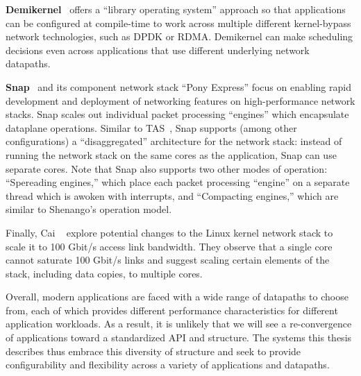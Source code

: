 \textbf{Demikernel}~\cite{demikernel} offers a ``library operating system'' approach so that applications can be configured at compile-time to work across multiple different kernel-bypass network technologies, such as DPDK or RDMA. Demikernel can make scheduling decisions even across applications that use different underlying network datapaths.

\textbf{Snap}~\cite{snap} and its component network stack ``Pony Express'' focus on enabling rapid development and deployment of networking features on high-performance network stacks. 
Snap scales out individual packet processing ``engines'' which encapsulate dataplane operations.
Similar to TAS~\cite{tas}, Snap supports (among other configurations) a ``disaggregated'' architecture for the network stack: instead of running the network stack on the same cores as the application, Snap can use separate cores. Note that Snap also supports two other modes of operation: 
``Spereading engines,'' which place each packet processing ``engine'' on a separate thread which is awoken with interrupts, and  
``Compacting engines,'' which are similar to Shenango's operation model.

Finally, Cai \etal~\cite{host-net-overheads} explore potential changes to the Linux kernel network stack to scale it to 100 Gbit/s access link bandwidth. They observe that a single core cannot saturate 100 Gbit/s links and suggest scaling certain elements of the stack, including data copies, to multiple cores.

Overall, modern applications are faced with a wide range of datapaths to choose from, each of which provides different performance characteristics for different application workloads. As a result, it is unlikely that we will see a re-convergence of applications toward a standardized API and structure. The systems this thesis describes thus embrace this diversity of structure and seek to provide configurability and flexibility across a variety of applications and datapaths.
